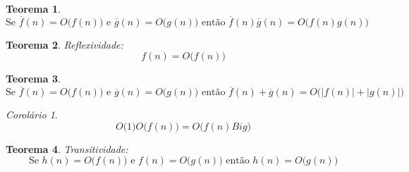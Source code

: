 \documentclass[a4paper,11pt]{article}
\theoremstyle{definition} \newtheorem{definicao}{Def}
\theoremstyle{definition} \newtheorem{exemplo}{Exemplo}
\theoremstyle{plain}      \newtheorem{teorema}{Teorema}
\theoremstyle{remark}     \newtheorem*{corolario}{Corol\'{a}rio}
\begin{document}
\begin{teorema}
\begin{equation*}
\text{Se } \overline{f}(n) = O\big(f(n)\big) \text{ e } \overline{g}(n) =
O\big(g(n)\big) \text{ ent\~{a}o } \overline{f}(n)\overline{g}(n) =
O\big(f(n)g(n)\big)
\end{equation*}
\end{teorema}

\begin{teorema}
Reflexividade:
\begin{equation*}
f(n) = O \Big(f(n) \Big)
\end{equation*}
\end{teorema}

\begin{teorema}
\begin{equation*}
\text{Se } \overline{f}(n) = O \Big(f(n) \Big) \text{ e }
\overline{g}(n) = O \Big(g(n) \Big) \text{ ent\~{a}o }
\overline{f}(n) + \overline{g}(n) =
O\bigg(\Big|f(n)\Big| + \Big|g(n)\Big|\bigg)
\end{equation*}
\end{teorema}

\begin{corolario}
\begin{equation*}
O\Big(1\Big)O\Big(f(n)\Big) = O\Big(f(n)Big)
\end{equation*}
\end{corolario}

\begin{teorema}
Transitividade:
\begin{equation*}
\text{Se } h(n) = O\Big(f(n)\Big) \text{ e } f(n) = O\Big(g(n)\Big)
\text{ ent\~{a}o } h(n) = O\Big(g(n)\Big)
\end{equation*}
\end{teorema}
\end{document}
